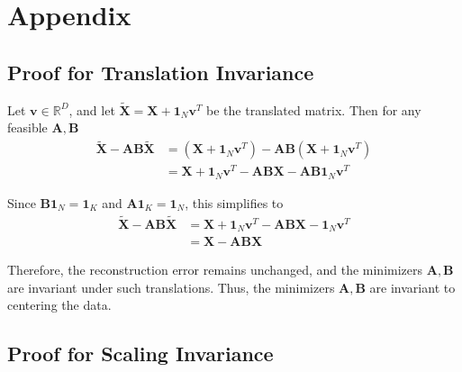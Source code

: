 \documentclass{article}
\begin{document}
\printbibliography[heading=none]

\clearpage
\section{Appendix}

\subsection{Proof for Translation Invariance}
\label{subsec:translation_invariance}

Let $\mathbf{v} \in \mathbb{R}^{D}$, and let $\tilde{\mathbf{X}} = \mathbf{X} + \mathbf{1}_N \mathbf{v}^T$ be the translated matrix. Then for any feasible $\mathbf{A}, \mathbf{B}$
\begin{equation}
    \begin{aligned}
    \tilde{\mathbf{X}} - \mathbf{A} \mathbf{B} \tilde{\mathbf{X}}
    &= \left(\mathbf{X} + \mathbf{1}_N \mathbf{v}^T \right) - \mathbf{A} \mathbf{B} \left(\mathbf{X} + \mathbf{1}_N \mathbf{v}^T \right) \\
    &= \mathbf{X} + \mathbf{1}_N \mathbf{v}^T - \mathbf{A} \mathbf{B} \mathbf{X} -  \mathbf{A} \mathbf{B} \mathbf{1}_N \mathbf{v}^T
    \end{aligned}
\end{equation}

Since $\mathbf{B} \mathbf{1}_N = \mathbf{1}_K$ and  $\mathbf{A} \mathbf{1}_K = \mathbf{1}_N$, this simplifies to
\begin{equation}
    \begin{aligned}
    \tilde{\mathbf{X}} - \mathbf{A} \mathbf{B} \tilde{\mathbf{X}}
    &= \mathbf{X} + \mathbf{1}_N \mathbf{v}^T - \mathbf{A} \mathbf{B} \mathbf{X} - \mathbf{1}_N \mathbf{v}^T \\
    &= \mathbf{X} - \mathbf{A} \mathbf{B} \mathbf{X}
    \end{aligned}
\end{equation}

Therefore, the reconstruction error remains unchanged, and the minimizers $\mathbf{A}, \mathbf{B}$ are invariant under such translations. Thus, the minimizers $\mathbf{A}, \mathbf{B}$ are invariant to centering the data.

\subsection{Proof for Scaling Invariance}
\label{subsec:scaling_invariance}
\end{document}
